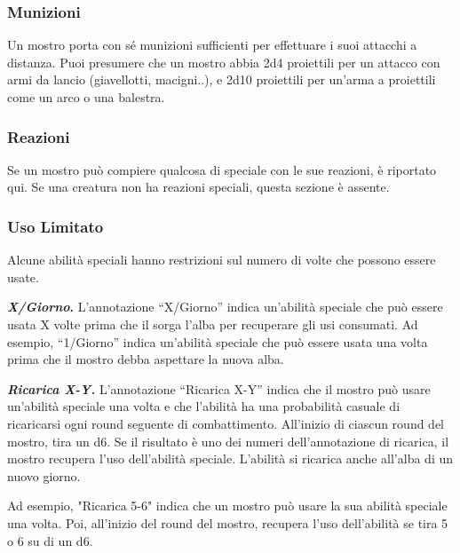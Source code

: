 \begin{multicols}{2}
	\subsubsection{Munizioni}

	Un mostro porta con sé munizioni sufficienti per effettuare i suoi attacchi a distanza. Puoi presumere che un mostro abbia 2d4 proiettili per un attacco con armi da lancio (giavellotti, macigni..), e 2d10 proiettili per un'arma a proiettili come un arco o una balestra.

	\subsubsection{Reazioni}

	Se un mostro può compiere qualcosa di speciale con le sue reazioni, è riportato qui. Se una creatura non ha reazioni speciali, questa sezione è assente.


	\subsubsection{Uso Limitato}

	Alcune abilità speciali hanno restrizioni sul numero di volte che possono essere usate.

	\textbf{\textit{X/Giorno}.} L'annotazione ``X/Giorno'' indica un'abilità speciale che può essere usata X volte prima che il sorga l'alba per recuperare gli usi consumati. Ad esempio, ``1/Giorno'' indica un'abilità speciale che può essere usata una volta prima che il mostro debba aspettare la nuova alba.

	\textit{\textbf{Ricarica X-Y.}} L'annotazione ``Ricarica X-Y'' indica che il mostro può usare un'abilità speciale una volta e che l'abilità ha una probabilità casuale di ricaricarsi ogni round seguente di combattimento. All'inizio di ciascun round del mostro, tira un d6. Se il risultato è uno dei numeri dell'annotazione di ricarica, il mostro recupera l'uso dell'abilità speciale. L'abilità si ricarica anche all'alba di un nuovo giorno.


	Ad esempio, "Ricarica 5-6" indica che un mostro può usare la sua abilità speciale una volta. Poi, all'inizio del round del mostro, recupera l'uso dell'abilità se tira 5 o 6 su di un d6.


\end{multicols}
